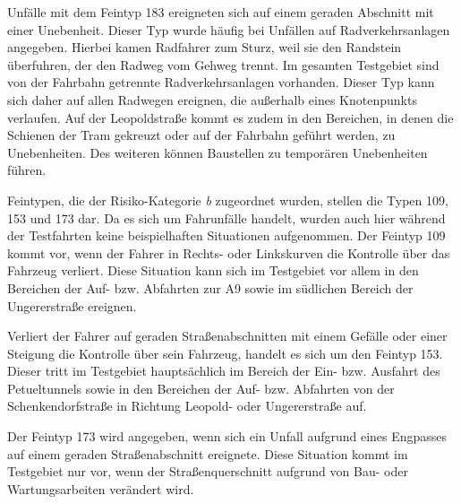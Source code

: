 Unfälle mit dem Feintyp 183 ereigneten sich auf einem geraden Abschnitt mit einer Unebenheit. Dieser Typ wurde häufig bei Unfällen auf Radverkehrsanlagen angegeben. Hierbei kamen Radfahrer zum Sturz, weil sie den Randstein überfuhren, der den Radweg vom Gehweg trennt. Im gesamten Testgebiet sind von der Fahrbahn getrennte Radverkehrsanlagen vorhanden. Dieser Typ kann sich daher auf allen Radwegen ereignen, die außerhalb eines Knotenpunkts verlaufen. Auf der Leopoldstraße kommt es zudem in den Bereichen, in denen die Schienen der Tram gekreuzt oder auf der Fahrbahn geführt werden, zu Unebenheiten. Des weiteren können Baustellen zu temporären Unebenheiten führen.

Feintypen, die der Risiko-Kategorie \textit{b} zugeordnet wurden, stellen die Typen 109, 153 und 173 dar. Da es sich um Fahrunfälle handelt, wurden auch hier während der Testfahrten keine beispielhaften Situationen aufgenommen. Der Feintyp 109 kommt vor, wenn der Fahrer in Rechts- oder Linkskurven die Kontrolle über das Fahrzeug verliert. Diese Situation kann sich im Testgebiet vor allem in den Bereichen der Auf- bzw. Abfahrten zur A9 sowie im südlichen Bereich der Ungererstraße ereignen.

Verliert der Fahrer auf geraden Straßenabschnitten mit einem Gefälle oder einer Steigung die Kontrolle über sein Fahrzeug, handelt es sich um den Feintyp 153. Dieser tritt im Testgebiet hauptsächlich im Bereich der Ein- bzw. Ausfahrt des Petueltunnels sowie in den Bereichen der Auf- bzw. Abfahrten von der Schenkendorfstraße in Richtung Leopold- oder Ungererstraße auf.

Der Feintyp 173 wird angegeben, wenn sich ein Unfall aufgrund eines Engpasses auf einem geraden Straßenabschnitt ereignete. Diese Situation kommt im Testgebiet nur vor, wenn der Straßenquerschnitt aufgrund von Bau- oder Wartungsarbeiten verändert wird.

